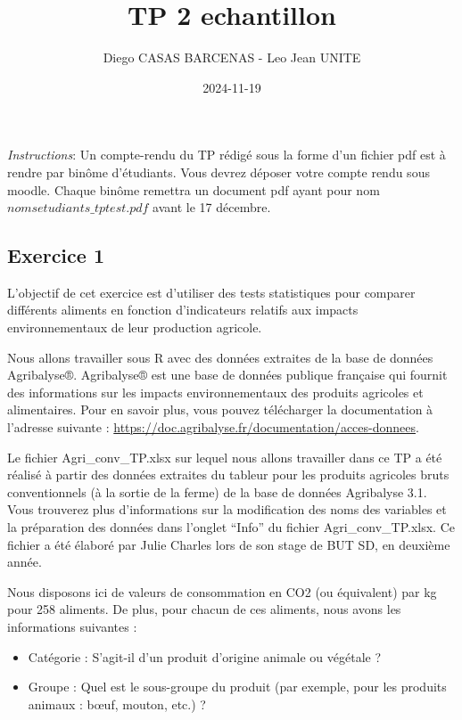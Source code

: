 \documentclass[
]{article}
\title{TP 2 echantillon}
\author{Diego CASAS BARCENAS - Leo Jean UNITE}
\date{2024-11-19}
\providecommand{\tightlist}{%
  \setlength{\itemsep}{0pt}\setlength{\parskip}{0pt}}
\begin{document}
\maketitle

\emph{Instructions}: Un compte-rendu du TP rédigé sous la forme d'un
fichier pdf est à rendre par binôme d'étudiants. Vous devrez déposer
votre compte rendu sous moodle. Chaque binôme remettra un document pdf
ayant pour nom \texttt{$nomsetudiants\_tptest.pdf$} avant le 17
décembre.

\hypertarget{exercice-1}{%
\subsection{Exercice 1}\label{exercice-1}}

L'objectif de cet exercice est d'utiliser des tests statistiques pour
comparer différents aliments en fonction d'indicateurs relatifs aux
impacts environnementaux de leur production agricole.

Nous allons travailler sous R avec des données extraites de la base de
données Agribalyse®. Agribalyse® est une base de données publique
française qui fournit des informations sur les impacts environnementaux
des produits agricoles et alimentaires. Pour en savoir plus, vous pouvez
télécharger la documentation à l'adresse suivante :
\url{https://doc.agribalyse.fr/documentation/acces-donnees}.

Le fichier Agri\_conv\_TP.xlsx sur lequel nous allons travailler dans ce
TP a été réalisé à partir des données extraites du tableur pour les
produits agricoles bruts conventionnels (à la sortie de la ferme) de la
base de données Agribalyse 3.1. Vous trouverez plus d'informations sur
la modification des noms des variables et la préparation des données
dans l'onglet ``Info'' du fichier Agri\_conv\_TP.xlsx. Ce fichier a été
élaboré par Julie Charles lors de son stage de BUT SD, en deuxième
année.

Nous disposons ici de valeurs de consommation en CO2 (ou équivalent) par
kg pour 258 aliments. De plus, pour chacun de ces aliments, nous avons
les informations suivantes :

\begin{itemize}
\tightlist
\item
  Catégorie : S'agit-il d'un produit d'origine animale ou végétale ?
\item
  Groupe : Quel est le sous-groupe du produit (par exemple, pour les
  produits animaux : bœuf, mouton, etc.) ?
\end{itemize}
\end{document}
